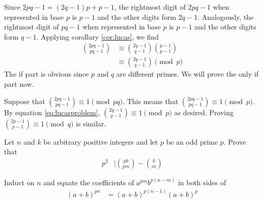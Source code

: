 \begin{solution}
	Since $2pq-1 = (2q-1)p+p-1$, the rightmost digit of $2pq-1$ when represented in base $p$ is $p-1$ and the other digits form $2q-1$. Analogously, the rightmost digit of $pq-1$ when represented in base $p$ is $p-1$ and the other digits form $q-1$. Applying corollary \eqref{cor:lucas}, we find
		\begin{align}
			\binom{2pq-1}{pq-1}
				& \equiv \binom{2q-1}{q-1} \binom{p-1}{p-1}\\
				& \equiv \binom{2q-1}{q-1} \pmod p\label{eq:lucasproblem}
		\end{align}
	The if part is obvious since $p$ and $q$ are different primes. We will prove the only if part now.

	Suppose  that $\binom{2pq-1}{pq-1}\equiv 1\pmod{pq}$. This means that $\binom{2pq-1}{pq-1}\equiv 1\pmod{p}$. By equation \eqref{eq:lucasproblem}, $\binom{2q-1}{q-1} \equiv 1 \pmod p$ as desired. Proving $\binom{2p-1}{p-1}\equiv 1 \pmod q$ is similar.
\end{solution}

\begin{problem}
	Let $n$ and $k$ be arbitrary positive integers and let $p$ be an odd prime $p$. Prove that
		\begin{align*}
			p^2
				& \mid \binom{pk}{pm} - \binom{k}{m}
		\end{align*}
\end{problem}

\begin{hint}
	Induct on $n$ and equate the coefficients of $a^{pm}b^{p(n-m)}$ in both sides of
		\begin{align*}
			(a+b)^{pn}
				& =(a+b)^{p(n-1)}(a+b)^{p}
		\end{align*}
\end{hint}


%
